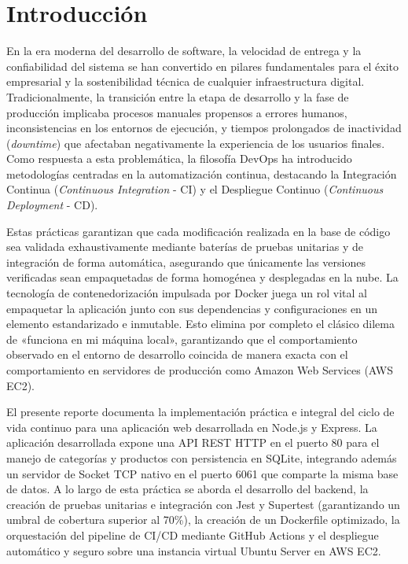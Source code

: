 \documentclass[12pt,letterpaper]{article}
\begin{document}
\newpage
\tableofcontents
\newpage
\listoffigures
\newpage

\section{Introducción}

En la era moderna del desarrollo de software, la velocidad de entrega y la confiabilidad del sistema se han convertido en pilares fundamentales para el éxito empresarial y la sostenibilidad técnica de cualquier infraestructura digital. Tradicionalmente, la transición entre la etapa de desarrollo y la fase de producción implicaba procesos manuales propensos a errores humanos, inconsistencias en los entornos de ejecución, y tiempos prolongados de inactividad (\emph{downtime}) que afectaban negativamente la experiencia de los usuarios finales. Como respuesta a esta problemática, la filosofía DevOps ha introducido metodologías centradas en la automatización continua, destacando la Integración Continua (\emph{Continuous Integration} - CI) y el Despliegue Continuo (\emph{Continuous Deployment} - CD).

Estas prácticas garantizan que cada modificación realizada en la base de código sea validada exhaustivamente mediante baterías de pruebas unitarias y de integración de forma automática, asegurando que únicamente las versiones verificadas sean empaquetadas de forma homogénea y desplegadas en la nube. La tecnología de contenedorización impulsada por Docker juega un rol vital al empaquetar la aplicación junto con sus dependencias y configuraciones en un elemento estandarizado e inmutable. Esto elimina por completo el clásico dilema de «funciona en mi máquina local», garantizando que el comportamiento observado en el entorno de desarrollo coincida de manera exacta con el comportamiento en servidores de producción como Amazon Web Services (AWS EC2).

El presente reporte documenta la implementación práctica e integral del ciclo de vida continuo para una aplicación web desarrollada en Node.js y Express. La aplicación desarrollada expone una API REST HTTP en el puerto 80 para el manejo de categorías y productos con persistencia en SQLite, integrando además un servidor de Socket TCP nativo en el puerto 6061 que comparte la misma base de datos. A lo largo de esta práctica se aborda el desarrollo del backend, la creación de pruebas unitarias e integración con Jest y Supertest (garantizando un umbral de cobertura superior al 70\%), la creación de un Dockerfile optimizado, la orquestación del pipeline de CI/CD mediante GitHub Actions y el despliegue automático y seguro sobre una instancia virtual Ubuntu Server en AWS EC2.
\end{document}
